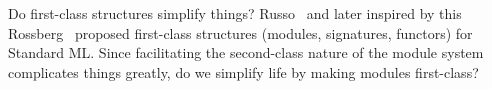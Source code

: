 \begin{puzzle}{Do first-class structures simplify things?}
Russo~\cite{russo1998types,russo2000first} and later inspired by this
Rossberg~\cite{rossberg20181ml} proposed first-class structures
(modules, signatures, functors) for Standard ML. Since facilitating the
second-class nature of the module system complicates things greatly, do
we simplify life by making modules first-class?
\end{puzzle}